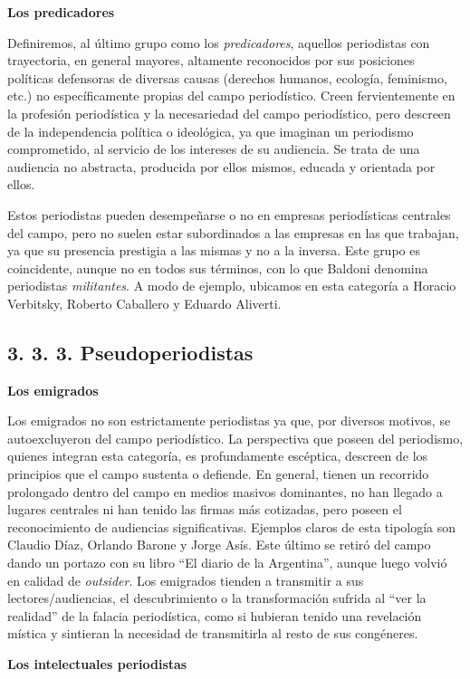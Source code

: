 \textbf{Los predicadores}

Definiremos, al último grupo como los \emph{predicadores}, aquellos periodistas con trayectoria, en general mayores, altamente reconocidos por sus posiciones políticas defensoras de diversas causas (derechos humanos, ecología, feminismo, etc.) no específicamente propias del campo periodístico. Creen fervientemente en la profesión periodística y la necesariedad del campo periodístico, pero descreen de la independencia política o ideológica, ya que imaginan un periodismo comprometido, al servicio de los intereses de su audiencia. Se trata de una audiencia no abstracta, producida por ellos mismos, educada y orientada por ellos.

Estos periodistas pueden desempeñarse o no en empresas periodísticas centrales del campo, pero no suelen estar subordinados a las empresas en las que trabajan, ya que su presencia prestigia a las mismas y no a la inversa. Este grupo es coincidente, aunque no en todos sus términos, con lo que Baldoni denomina periodistas \emph{militantes}. A modo de ejemplo, ubicamos en esta categoría a Horacio Verbitsky, Roberto Caballero y Eduardo Aliverti.


\subsection{3. 3. 3. Pseudoperiodistas}

\textbf{Los emigrados}

Los emigrados no son estrictamente periodistas ya que, por diversos motivos, se autoexcluyeron del campo periodístico. La perspectiva que poseen del periodismo, quienes integran esta categoría, es profundamente escéptica, descreen de los principios que el campo sustenta o defiende. En general, tienen un recorrido prolongado dentro del campo en medios masivos dominantes, no han llegado a lugares centrales ni han tenido las firmas más cotizadas, pero poseen el reconocimiento de audiencias significativas. Ejemplos claros de esta tipología son Claudio Díaz, Orlando Barone y Jorge Asís. Este último se retiró del campo dando un portazo con su libro \enquote{El diario de la Argentina}, aunque luego volvió en calidad de \emph{outsider}. Los emigrados tienden a transmitir a sus lectores/audiencias, el descubrimiento o la transformación sufrida al \enquote{ver la realidad} de la falacia periodística, como si hubieran tenido una revelación mística y sintieran la necesidad de transmitirla al resto de sus congéneres.

\textbf{Los intelectuales periodistas}

